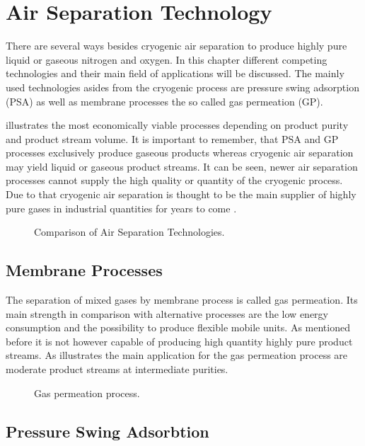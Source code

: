 \chapter{Air Separation Technology}
\label{chp:airsep}
There are several ways besides cryogenic air separation to produce highly pure liquid or gaseous
nitrogen and oxygen. In this chapter different competing technologies and their main field of
applications will be discussed. The mainly used technologies asides from the cryogenic process 
are pressure swing adsorption (PSA) as well as membrane processes the so called gas permeation (GP). 

 illustrates the most economically viable processes depending on product
purity and product stream volume. It is important to remember, that PSA and GP processes exclusively produce 
gaseous products whereas cryogenic air separation may yield liquid or gaseous product streams. 
It can be seen, newer air separation processes cannot supply the high quality or quantity of the cryogenic 
process. Due to that cryogenic air separation is thought to be the main supplier of highly pure gases in 
industrial quantities for years to come \addref.
 
\begin{figure}
	
	\caption{Comparison of Air Separation Technologies.}
	\label{fig:tech_compar}
\end{figure}

\section{Membrane Processes}
\label{sec:membrane}
The separation of mixed gases by membrane process is called gas permeation. Its main strength 
in comparison with alternative processes are the low energy consumption and the possibility to 
produce flexible mobile units. As mentioned before it is not however capable of producing high
quantity highly pure product streams. As  illustrates the main application 
for the gas permeation process are moderate product streams at intermediate purities.   

\begin{figure}
	\center
	
	\caption{Gas permeation process.}
	\label{fig:gas_permeation} 
\end{figure}


\section{Pressure Swing Adsorbtion}
\label{sec:psa}

